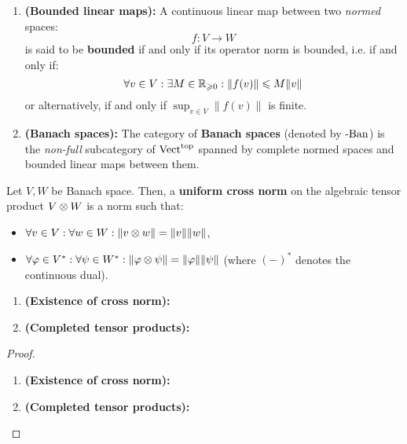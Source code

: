                \begin{definition} \label{def: banach_spaces}
                    \noindent
                    \begin{enumerate}
                        \item \textbf{(Bounded linear maps):} A continuous linear map between two \textit{normed} spaces:
                            $$f: V \to W$$
                        is said to be \textbf{bounded} if and only if its operator norm is bounded, i.e. if and only if:
                            $$\forall v \in V: \exists M \in \mathbb{R}_{\geqslant 0}: \|f(v)\| \leqslant M \|v\|$$
                        or alternatively, if and only if $\sup_{v \in V} \|f(v)\|$ is finite.
                        \item \textbf{(Banach spaces):} The category of \textbf{Banach spaces} (denoted by $\text{-}\mathrm{Ban}$) is the \textit{non-full} subcategory of $\mathrm{Vect}^{\mathrm{top}}$ spanned by complete normed spaces and bounded linear maps between them.
                    \end{enumerate}
                \end{definition}
                \begin{definition} \label{def: cross_norms}
                    Let $V, W$ be Banach space. Then, a \textbf{uniform cross norm} on the algebraic tensor product $V \tensor W$ is a norm such that:
                        \begin{itemize}
                            \item $\forall v \in V: \forall w \in W: \|v \tensor w\| = \|v\| \|w\|$,
                            \item $\forall \varphi \in V^*: \forall \psi \in W^*: \|\varphi \tensor \psi\| = \|\varphi\| \|\psi\|$ (where $(-)^*$ denotes the continuous dual).
                        \end{itemize}
                \end{definition}
                \begin{proposition} \label{prop: tensor_product_of_banach_spaces}
                    \noindent
                    \begin{enumerate}
                        \item \textbf{(Existence of cross norm):}
                        \item \textbf{(Completed tensor products):}
                    \end{enumerate}
                \end{proposition}
                    \begin{proof}
                        \noindent
                        \begin{enumerate}
                            \item \textbf{(Existence of cross norm):}
                            \item \textbf{(Completed tensor products):}
                        \end{enumerate}
                    \end{proof}
                
